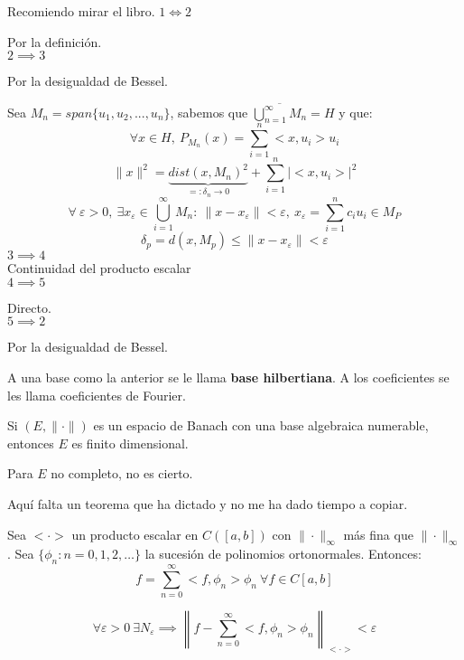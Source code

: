 \documentclass[openany]{book}
\begin{document}
\begin{demonstration}
    Recomiendo mirar el libro.
    $ 1 \iff 2 $

    Por la definición.\\
    $ 2 \implies 3 $

    Por la desigualdad de Bessel.

    Sea $ M_n = span \{u_1,u_2,...,u_n\} $, sabemos que $ \overline{\bigcup_{n=1}^{\infty}M_n} = H $ y que:
    $$ \forall x \in H,\ P_{M_n}(x) = \sum\limits_{i=1}^{n}<x,u_i>u_i $$
    $$ \|x\|^2 = \underbrace{dist(x,M_n)^2}_{=: \delta_n \to 0 } + \sum\limits_{i=1}^{n}|<x,u_i>|^2 $$
    $$ \forall\ \varepsilon >0,\ \exists x_{\varepsilon} \in \bigcup_{i=1}^{\infty} M_n:\ \|x-x_{\varepsilon}\| < \varepsilon,\ x_{\varepsilon} = \sum\limits_{i=1}^{n}c_iu_i \in M_{P} $$
    $$ \delta_{p} = d(x,M_{p}) \leq \|x-x_{\varepsilon}\| < \varepsilon $$
    $ 3 \implies 4 $\\

    Continuidad del producto escalar\\
    $ 4 \implies 5 $
    
    Directo.\\
    $ 5 \implies 2 $

    Por la desigualdad de Bessel.
\end{demonstration}

\begin{definition}
    A una base como la anterior se le llama \textbf{base hilbertiana}. A los coeficientes se les llama coeficientes de Fourier.
\end{definition}

\begin{lemma}
    Si $ (E,\|\cdot \|) $ es un espacio de Banach con una base algebraica numerable, entonces $ E $ es finito dimensional. 
    
    Para $ E $ no completo, no es cierto.
\end{lemma}

Aquí falta un teorema que ha dictado y no me ha dado tiempo a copiar.


\begin{theorem}
    Sea $ <\cdot > $ un producto escalar en $ C([a,b]) $ con $ \|\cdot \|_{\infty} $ más fina que $ \|\cdot \|_{\infty} $. Sea $ \{\phi_{n}: n = 0,1,2,\dots\}  $ la sucesión de polinomios ortonormales. Entonces:
    $$ f = \sum\limits_{n=0}^{\infty}<f,\phi_n>\phi_n\ \forall f \in C[a,b] $$

    $$ \forall \varepsilon>0\ \exists N_{\varepsilon} \implies \left\|f - \sum\limits_{n=0}^{\infty}<f,\phi_{n}>\phi_n\right\|_{<\cdot >} < \varepsilon$$
\end{theorem}
\end{document}
